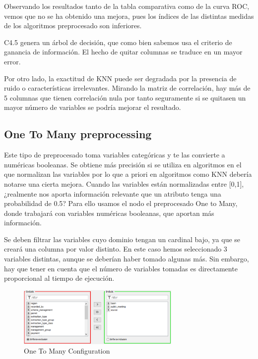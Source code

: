 	Observando los resultados tanto de la tabla comparativa como de la curva ROC, vemos que no se ha obtenido una mejora, pues los índices de las distintas medidas de los algoritmos preprocesado son inferiores. 
	
	C4.5 genera un árbol de decisión, que como bien sabemos usa el criterio de ganancia de información. El hecho de quitar columnas se traduce en un mayor error.
	
	Por otro lado, la exactitud de KNN puede ser degradada por la presencia de ruido o características irrelevantes. Mirando la matriz de correlación, hay más de 5 columnas que tienen correlación nula por tanto seguramente si se quitasen un mayor número de variables se podría mejorar el resultado.
	
	\subsection{One To Many preprocessing}
	
	\hspace{1cm} Este tipo de preprocesado toma variables categóricas y te las convierte a numéricas booleanas.
	Se obtiene más precisión si se utiliza en algoritmos en el que normalizan las variables por lo que a priori en algoritmos como KNN debería notarse una cierta mejora. Cuando las variables están normalizadas entre [0,1], ¿realmente nos aporta información relevante que un atributo tenga una probabilidad de 0.5? Para ello usamos el nodo el preprocesado One to Many, donde trabajará con variables numéricas booleanas, que aportan más información.
	
	
	Se deben filtrar las variables cuyo dominio tengan un cardinal bajo, ya que se creará una columna por valor distinto. En este caso hemos seleccionado 3 variables distintas, aunque se deberían haber tomado algunas más. Sin embargo, hay que tener en cuenta que el número de variables tomadas es directamente proporcional al tiempo de ejecución.
	
	
	
	\begin{figure}[H]
		\centering
		\includegraphics[width=0.7\textwidth]{img/onetomany.png}
		\caption{One To Many Configuration}
	\end{figure}
	
